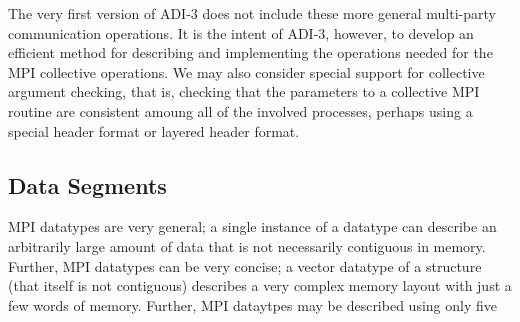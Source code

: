 The very first version of ADI-3 does not include these more general
multi-party communication operations.  It is the intent of ADI-3,
however, to develop an efficient method for describing and
implementing the operations needed for the MPI collective operations.
We may also consider special support for collective argument checking,
that is, checking that the parameters to a collective MPI routine are
consistent amoung all of the involved processes, perhaps using a
special header format or layered header format.

\subsection{Data Segments}
\label{sec:segment}

MPI datatypes are very general; a single instance of a datatype can
describe an arbitrarily large amount of data that is not necessarily
contiguous in memory.  Further, MPI datatypes can be very concise;
a vector datatype of a structure (that itself is not contiguous)
describes a very complex memory layout with just a few words of
memory.  Further, MPI dataytpes may be described using only five
